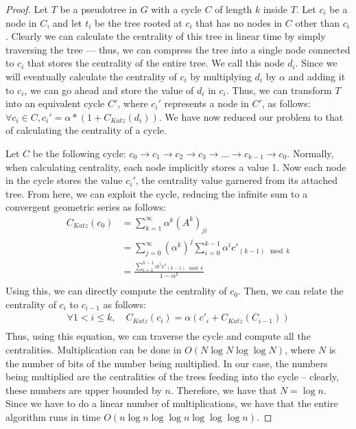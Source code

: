 \documentclass[10pt]{article}
\theoremstyle{definition}
\begin{document}
\begin{proof}
Let $T$ be a pseudotree in $G$ with a cycle $C$ of length $k$ inside $T$. Let $c_i$ be a node in $C$, and let $t_i$ be the tree rooted at  $c_i$ that has no nodes in $C$ other than $c_i$. Clearly we can calculate the centrality of this tree in linear time by simply traversing the tree --- thus, we can compress the tree into a single node connected to $c_i$ that stores the centrality of the entire tree. We call this node $d_i$. Since we will eventually calculate the centrality of $c_i$ by multiplying $d_i$ by $\alpha$ and adding it to $c_i$, we can go ahead and store the value of $d_i$ in $c_i$. Thus, we can transform $T$ into an equivalent cycle $C'$, where $c_i'$ represents a node in $C'$, as follows: $\forall c_i \in C, c_i' = \alpha * (1 + C_{Katz}(d_i))$.  We have now reduced our problem to that of calculating the centrality of a cycle.

Let $C$ be the following cycle: $c_0 \rightarrow c_1 \rightarrow c_2 \rightarrow c_3 \rightarrow ... \rightarrow c_{k-1}  \rightarrow c_0$. Normally, when calculating centrality, each node implicitly stores a value 1. Now each node in the cycle stores the value $c_i'$, the centrality value garnered from its attached tree. From here, we can exploit the cycle, reducing the infinite sum to a convergent geometric series as follows: 
\begin{align*}
C_{Katz}(c_0) &= \sum_{k=1}^\infty \alpha^k(A^k)_{ji}\\
&= \sum_{j=0}^{\infty}(\alpha^k)^j\sum_{i=0}^{k-1}\alpha^i c'_{(k-1) \mod k}\\
&= \frac{\sum\limits_{i=1}^{k-1}\alpha^i c'_{(k-1) \mod k}}{1-\alpha^k}\\
\end{align*}
Using this, we can directly compute the centrality of $c_0$. Then, we can relate the centrality of $c_i$ to $c_{i-1}$ as follows:
\begin{align*}
\forall 1 < i \leq k, \quad C_{Katz}(c_i) =\alpha( c'_{i} +  C_{Katz}(C_{i-1}))\\
\end{align*}
Thus, using this equation, we can traverse the cycle and compute all the centralities. Multiplication can be done in $O(N\log N \log \log N)$\cite{german}, where $N$ is the number of bits of the number being multiplied. In our case, the numbers being multiplied are the centralities of the trees feeding into the cycle -- clearly, these numbers are upper bounded by $n$. Therefore, we have that $N = \log n$. Since we have to do a linear number of multiplications, we have that the entire algorithm runs in time $O(n\log n \log \log n \log \log \log n)$.

\end{proof}
\end{document}
